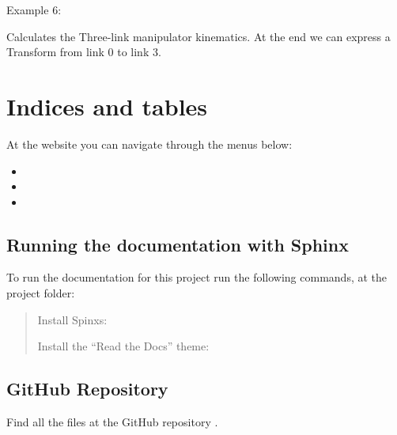 \documentclass[letterpaper,10pt,english,openany,oneside]{sphinxmanual}
\begin{document}

\begin{fulllineitems}
\label{\detokenize{MatrixManipulationSymbolic:MatrixManipulationSymbolic.main}}
Example 6:

Calculates the Three-link manipulator kinematics.
At the end we can express a Transform from link 0 to link 3.

\end{fulllineitems}



\chapter{Indices and tables}
\label{\detokenize{index:indices-and-tables}}
At the website you can navigate through the menus below:
\begin{itemize}
\item {} 

\item {} 

\item {} 

\end{itemize}


\section{Running the documentation with Sphinx}
\label{\detokenize{index:running-the-documentation-with-sphinx}}
To run the documentation for this project run the following commands, at the project folder:
\begin{quote}

Install Spinxs:


Install the “Read the Docs” theme:



\end{quote}


\section{GitHub Repository}
\label{\detokenize{index:github-repository}}
Find all the files at the GitHub repository .
\end{document}
